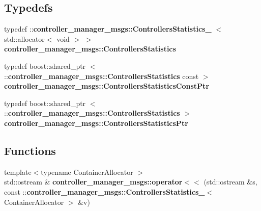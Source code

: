 \subsection*{\-Typedefs}
\begin{DoxyCompactItemize}
\item 
typedef \*
\-::{\bf controller\-\_\-manager\-\_\-msgs\-::\-Controllers\-Statistics\-\_\-}\*
$<$ std\-::allocator$<$ void $>$ $>$ {\bf controller\-\_\-manager\-\_\-msgs\-::\-Controllers\-Statistics}
\item 
typedef boost\-::shared\-\_\-ptr\*
$<$ \-::{\bf controller\-\_\-manager\-\_\-msgs\-::\-Controllers\-Statistics} \*
const  $>$ {\bf controller\-\_\-manager\-\_\-msgs\-::\-Controllers\-Statistics\-Const\-Ptr}
\item 
typedef boost\-::shared\-\_\-ptr\*
$<$ \-::{\bf controller\-\_\-manager\-\_\-msgs\-::\-Controllers\-Statistics} $>$ {\bf controller\-\_\-manager\-\_\-msgs\-::\-Controllers\-Statistics\-Ptr}
\end{DoxyCompactItemize}
\subsection*{\-Functions}
\begin{DoxyCompactItemize}
\item 
{\footnotesize template$<$typename Container\-Allocator $>$ }\\std\-::ostream \& {\bf controller\-\_\-manager\-\_\-msgs\-::operator$<$$<$} (std\-::ostream \&s, const \-::{\bf controller\-\_\-manager\-\_\-msgs\-::\-Controllers\-Statistics\-\_\-}$<$ \-Container\-Allocator $>$ \&v)
\end{DoxyCompactItemize}
